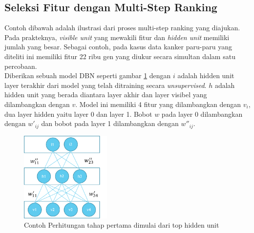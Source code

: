 \subsection{Seleksi Fitur dengan Multi-Step Ranking }

Contoh dibawah adalah ilustrasi dari proses multi-step ranking yang diajukan. Pada prakteknya, \textit{visible unit} yang mewakili fitur dan \textit{hidden unit} memiliki jumlah yang besar. Sebagai contoh, pada kasus data kanker paru-paru yang diteliti ini memiliki fitur 22 ribu gen yang diukur secara simultan dalam satu percobaan. \\
Diberikan sebuah model DBN seperti gambar \ref{fig:multistep2} dengan $i$ adalah hidden unit layer terakhir dari model yang telah ditraining secara \textit{unsupervised}. $h$ adalah hidden unit yang berada diantara layer akhir dan layer visibel yang dilambangkan dengan $v$. Model ini memiliki 4 fitur yang dilambangkan dengan $v_i$, dua layer hidden yaitu layer 0 dan layer 1. Bobot $w$ pada layer 0 dilambangkan dengan $w'_{ij}$ dan bobot pada layer 1 dilambangkan dengan $w''_{ij}$.

\begin{figure}
	\centering
	\includegraphics[width=0.4\textwidth]
		{pics/multistep2.png}
	\caption{Contoh Perhitungan tahap pertama dimulai dari top hidden unit }
	\label{fig:multistep2}
\end{figure}

